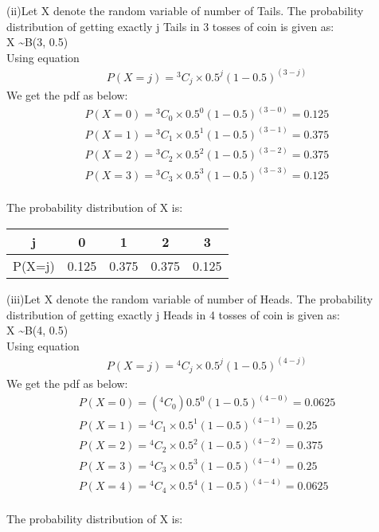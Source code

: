 \documentclass[journal,12pt,twocolumn]{IEEEtran}
\newcommand*{\Comb}[2]{{}^{#1}C_{#2}}%
\begin{document}
(ii)Let X denote the random variable of number of Tails.
The probability distribution of getting exactly j Tails in 3 tosses of coin is given as:
\\X \textasciitilde B(3, 0.5) 
\\Using equation 
\begin{align}
    P(X = j) = \Comb{3}{j}\times { 0.5^j (1-0.5)^{(3-j)}}
\end{align}
We get the pdf as below:
\begin{align}
    P(X=0) = \Comb{3}{0}\times { 0.5^0 (1-0.5)^{(3-0)}}
    =0.125
    \\P(X=1) = \Comb{3}{1}\times { 0.5^1 (1-0.5)^{(3-1)}} = 0.375
    \\P(X=2) = \Comb{3}{2}\times { 0.5^2 (1-0.5)^{(3-2)}} = 0.375
    \\P(X=3) = \Comb{3}{3}\times { 0.5^3 (1-0.5)^{(3-3)}} = 0.125
\end{align}
\\The probability distribution of X is: 

\begin{center}
\begin{tabular}{ |c|c|c|c|c| } 
 \hline
 j & 0 & 1 & 2 & 3 \\ \hline
 P(X=j) & 0.125& 0.375 & 0.375 & 0.125 \\ 
 \hline
\end{tabular}
\end{center}
(iii)Let X denote the random variable of number of Heads.
The probability distribution of getting exactly j Heads in 4 tosses of coin is given as:
\\X \textasciitilde B(4, 0.5) 
\\Using equation 
\begin{align}
    P(X = j) = \Comb{4}{j}\times { 0.5^j (1-0.5)^{(4-j)}}
\end{align}
We get the pdf as below:
\begin{align}
    P(X=0) =(\Comb{4}{0}){ 0.5^0 (1-0.5)^{(4-0)}}
    =0.0625
    \\P(X=1) = \Comb{4}{1}\times { 0.5^1 (1-0.5)^{(4-1)}} = 0.25
    \\P(X=2) = \Comb{4}{2}\times { 0.5^2 (1-0.5)^{(4-2)}} = 0.375
    \\P(X=3) = \Comb{4}{3}\times { 0.5^3 (1-0.5)^{(4-4)}} = 0.25
    \\P(X=4) = \Comb{4}{4}\times { 0.5^4 (1-0.5)^{(4-4)}} = 0.0625
\end{align}
\\The probability distribution of X is: 
\end{document}

